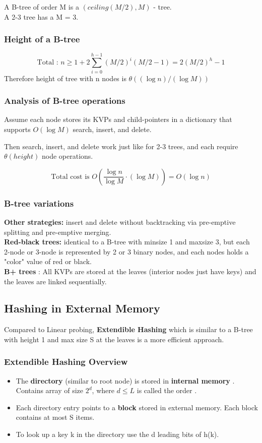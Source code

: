 \documentclass{article}
\begin{document}
A B-tree of order M is a \((ceiling(M/2), M)\) - tree. \\
A 2-3 tree has a M = 3. 

\subsubsection*{Height of a B-tree}
$$ \text{Total : } n \geq 1 + 2 \sum_{i=0}^{h-1} (M/2)^i (M/2-1) = 2(M/2)^h - 1$$
Therefore height of tree with n nodes is \(\theta((\log n ) / (\log M))\)

\subsubsection*{Analysis of B-tree operations}
Assume each node stores its KVPs and child-pointers in a dictionary that supports \(O(\log M)\) search, insert, and delete. 

Then search, insert, and delete work just like for 2-3 trees, and each
require \(\theta(height)\) node operations.

$$ \text{Total cost is } O\left(\frac{\log n}{\log M} \cdot (\log M)\right) = O(\log n) $$

\subsubsection*{B-tree variations}
\textbf{Other strategies:} insert and delete without backtracking via pre-emptive splitting and pre-emptive merging. \\
\textbf{Red-black trees:} identical to a B-tree with minsize 1 and maxsize 3, but each 2-node or 3-node is represented by 2 or 3 binary nodes, and each nodes holds a "color" value of red or black. \\
\textbf{B+ trees} : All KVPs are stored at the leaves (interior nodes just have keys) and the leaves are linked sequentially. 


\subsection*{Hashing in External Memory}
Compared to Linear probing, \textbf{Extendible Hashing} which is similar to a B-tree with height 1 and max size S at the leaves is a more efficient approach. 

\subsubsection*{Extendible Hashing Overview}
\begin{itemize}
\item The \textbf{directory} (similar to root node) is stored in \textbf{internal memory} . Contains array of size \(2^d\), where \(d \leq L\) is called the order .
\item Each directory entry points to a \textbf{block} stored in external memory. Each block contains at most S items. 
\item To look up a key k in the directory use the d leading bits of h(k).
\end{itemize}
\end{document}
